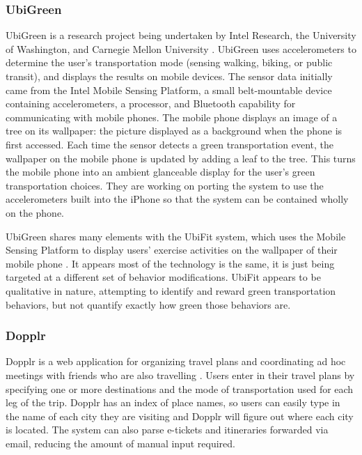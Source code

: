 \subsubsection{UbiGreen}
\label{ubigreen}

UbiGreen is a research project being undertaken by Intel Research, the University of Washington, and Carnegie Mellon University \cite{ubigreen-website}. UbiGreen uses accelerometers to determine the user's transportation mode (sensing walking, biking, or public transit), and displays the results on mobile devices. The sensor data initially came from the Intel Mobile Sensing Platform, a small belt-mountable device containing accelerometers, a processor, and Bluetooth capability for communicating with mobile phones. The mobile phone displays an image of a tree on its wallpaper: the picture displayed as a background when the phone is first accessed. Each time the sensor detects a green transportation event, the wallpaper on the mobile phone is updated by adding a leaf to the tree. This turns the mobile phone into an ambient glanceable display for the user's green transportation choices. They are working on porting the system to use the accelerometers built into the iPhone so that the system can be contained wholly on the phone.

UbiGreen shares many elements with the UbiFit system, which uses the Mobile Sensing Platform to display users' exercise activities on the wallpaper of their mobile phone \cite{Consolvo2008Flowers-or-robot}. It appears most of the technology is the same, it is just being targeted at a different set of behavior modifications. UbiFit appears to be qualitative in nature, attempting to identify and reward green transportation behaviors, but not quantify exactly how green those behaviors are.

\subsubsection{Dopplr}
\label{dopplr}
Dopplr is a web application for organizing travel plans and coordinating ad hoc meetings with friends who are also travelling \cite{dopplr-website}. Users enter in their travel plans by specifying one or more destinations and the mode of transportation used for each leg of the trip. Dopplr has an index of place names, so users can easily type in the name of each city they are visiting and Dopplr will figure out where each city is located. The system can also parse e-tickets and itineraries forwarded via email, reducing the amount of manual input required.

